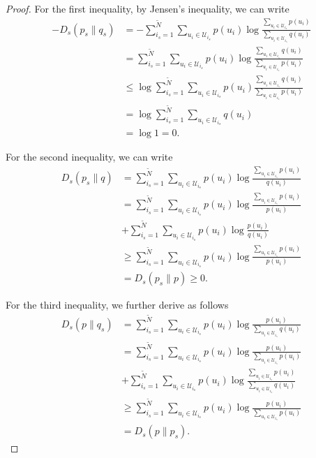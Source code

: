 \documentclass[12pt, draftclsnofoot,onecolumn]{IEEEtran}
\begin{document}
\begin{proof}
For the first inequality, by Jensen's inequality, we can write
\begin{equation}
\begin{aligned}
-D_s\left(p_s\|q_s\right)&=-\sum_{i_s=1}^{\tilde{N}}\sum_{u_i\in \mathcal{U}_{i_s}}p(u_i) \log \frac{\sum_{u_i\in \mathcal{U}_{i_s}} p(u_i)}{\sum_{u_i\in \mathcal{U}_{i_s}} q(u_i)}\\
&=\sum_{i_s=1}^{\tilde{N}}\sum_{u_i\in \mathcal{U}_{i_s}}p(u_i) \log \frac{\sum_{u_i\in \mathcal{U}_{i_s}} q(u_i)}{\sum_{u_i\in \mathcal{U}_{i_s}} p(u_i)}\\
&\leq \log \sum_{i_s=1}^{\tilde{N}}\sum_{u_i\in \mathcal{U}_{i_s}}p(u_i)  \frac{\sum_{u_i\in \mathcal{U}_{i_s}} q(u_i)}{\sum_{u_i\in \mathcal{U}_{i_s}} p(u_i)}\\
&=\log \sum_{i_s=1}^{\tilde{N}}  {\sum_{u_i\in \mathcal{U}_{i_s}} q(u_i)}\\
&=\log 1 =0.
\end{aligned}
\end{equation}

For the second inequality, we can write
\begin{equation}
\begin{aligned}
D_s\left(p_s\|q\right)&=\sum_{i_s=1}^{\tilde{N}}\sum_{u_i\in \mathcal{U}_{i_s}}p(u_i) \log \frac{\sum_{u_i\in \mathcal{U}_{i_s}} p(u_i)}{q(u_i)}\\
&=\sum_{i_s=1}^{\tilde{N}}\sum_{u_i\in \mathcal{U}_{i_s}}p(u_i) \log \frac{\sum_{u_i\in \mathcal{U}_{i_s}} p(u_i)}{p(u_i)}\\
&+\sum_{i_s=1}^{\tilde{N}}\sum_{u_i\in \mathcal{U}_{i_s}}p(u_i) \log \frac{ p(u_i)}{q(u_i)}\\
&\geq \sum_{i_s=1}^{\tilde{N}}\sum_{u_i\in \mathcal{U}_{i_s}}p(u_i) \log \frac{\sum_{u_i\in \mathcal{U}_{i_s}} p(u_i)}{p(u_i)}\\
&=D_s(p_s\|p)\geq 0.
\end{aligned}
\end{equation}

For the third inequality, we further derive as follows
\begin{equation}
\begin{aligned}
D_s\left(p\|q_s\right)&=\sum_{i_s=1}^{\tilde{N}}\sum_{u_i\in \mathcal{U}_{i_s}}p(u_i) \log \frac{p(u_i)}{\sum_{u_i\in \mathcal{U}_{i_s}} q(u_i)}\\
&=\sum_{i_s=1}^{\tilde{N}}\sum_{u_i\in \mathcal{U}_{i_s}}p(u_i) \log \frac{p(u_i)}{\sum_{u_i\in \mathcal{U}_{i_s}} p(u_i)}\\
&+\sum_{i_s=1}^{\tilde{N}}\sum_{u_i\in \mathcal{U}_{i_s}}p(u_i) \log \frac{\sum_{u_i\in \mathcal{U}_{i_s}} p(u_i)}{\sum_{u_i\in \mathcal{U}_{i_s}} q(u_i)}\\
&\geq \sum_{i_s=1}^{\tilde{N}}\sum_{u_i\in \mathcal{U}_{i_s}}p(u_i) \log \frac{p(u_i)}{\sum_{u_i\in \mathcal{U}_{i_s}} p(u_i)}\\
&=D_s(p\|p_s).
\end{aligned}
\end{equation}


\end{proof}
\end{document}
